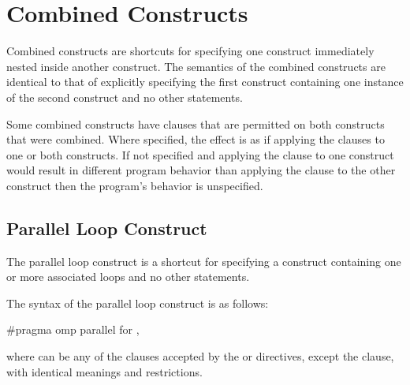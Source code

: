%
%
\section{Combined Constructs}
\label{sec:Combined Constructs}
Combined constructs are shortcuts for specifying one construct immediately nested 
inside another construct. The semantics of the combined constructs are identical to that 
of explicitly specifying the first construct containing one instance of the second 
construct and no other statements.

Some combined constructs have clauses that are permitted on both constructs that were 
combined. Where specified, the effect is as if applying the clauses to one or both 
constructs. If not specified and applying the clause to one construct would result in 
different program behavior than applying the clause to the other construct then the 
program’s behavior is unspecified. 











\subsection{Parallel Loop Construct}
\label{subsec:Parallel Loop Construct}
\summary
The parallel loop construct is a shortcut for specifying a  construct 
containing one or more associated loops and no other statements.

\syntax
\ccppspecificstart
The syntax of the parallel loop construct is as follows:

\begin{boxedcode}
\#pragma omp parallel for \plc{[clause[ [},\plc{] clause] ... ] new-line}
\end{boxedcode}

where  can be any of the clauses accepted by the  or  directives, 
except the  clause, with identical meanings and restrictions.
\ccppspecificend

